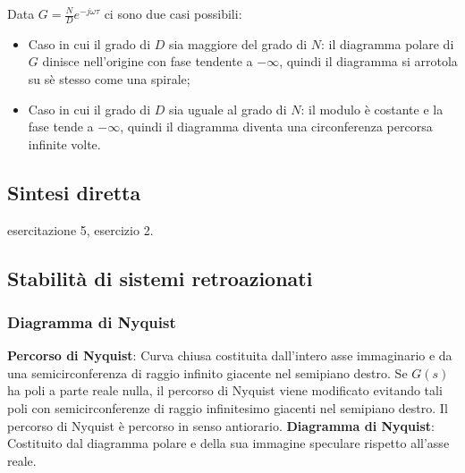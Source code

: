 \begin{landscape}
\begin{center}
        \end{center}
        Data $G = \frac{N}{D} e^{- j \omega \tau}$ ci sono due casi possibili:
        \begin{itemize}
            \item Caso in cui il grado di $D$ sia maggiore del grado di $N$: il diagramma polare di $G$ dinisce nell'origine con fase tendente a $- \infty$, quindi il diagramma si arrotola su sè stesso come una spirale;
            \item Caso in cui il grado di $D$ sia uguale al grado di $N$: il modulo è costante e la fase tende a $- \infty$, quindi il diagramma diventa una circonferenza percorsa infinite volte.
        \end{itemize}
    \subsection*{Sintesi diretta}
    esercitazione 5, esercizio 2.
    \subsection*{Stabilità di sistemi retroazionati}
    \subsubsection*{Diagramma di Nyquist}
    \textbf{Percorso di Nyquist}: Curva chiusa costituita dall'intero asse immaginario e da una semicirconferenza di raggio infinito giacente nel semipiano destro. Se $G(s)$ ha poli a parte reale nulla, il percorso di Nyquist viene modificato evitando tali poli con semicirconferenze di raggio infinitesimo giacenti nel semipiano destro. Il percorso di Nyquist è percorso in senso antiorario.\newline
    \newline
    \textbf{Diagramma di Nyquist}: Costituito dal diagramma polare e della sua immagine speculare rispetto all'asse reale.

\end{landscape}
